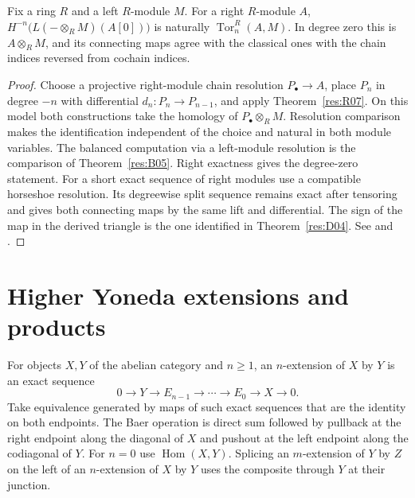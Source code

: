 \begin{proposition}
\label{res:R14}
Fix a ring \(R\) and a left \(R\)-module \(M\). For a right
\(R\)-module \(A\), \(H^{-n}\bigl(L(-\otimes_R M)(A[0])\bigr)\)
is naturally \(\operatorname{Tor}_n^R(A,M)\). In degree zero this is
\(A\otimes_R M\), and its connecting maps agree with the classical
ones with the chain indices reversed from cochain indices.
\end{proposition}
\begin{proof}
Choose a projective right-module chain resolution \(P_\bullet\to A\),
place \(P_n\) in degree \(-n\) with differential \(d_n:P_n\to P_{n-1}\),
and apply Theorem~\ref{res:R07}. On this model both constructions
take the homology of \(P_\bullet\otimes_R M\). Resolution comparison
makes the identification independent of the choice and natural in both
module variables. The balanced computation via a left-module resolution
is the comparison of Theorem~\ref{res:B05}. Right exactness gives
the degree-zero statement. For a short exact sequence of right modules
use a compatible horseshoe resolution. Its degreewise split sequence
remains exact after tensoring and gives both connecting maps by the
same lift and differential. The sign of the map in the derived
triangle is the one identified in Theorem~\ref{res:D04}. See
\cite[Section 3.2]{weibel} and \cite[Chapter 11]{p103}.
\end{proof}

\section{Higher Yoneda extensions and products}

For objects \(X,Y\) of the abelian category and \(n\ge1\), an
\(n\)-extension of \(X\) by \(Y\) is an exact sequence
\[
  0\longrightarrow Y\longrightarrow E_{n-1}\longrightarrow
  \cdots\longrightarrow E_0\longrightarrow X\longrightarrow 0 .
\]
Take equivalence generated by maps of such exact sequences that
are the identity on both endpoints. The Baer operation is direct
sum followed by pullback at the right endpoint along the diagonal
of \(X\) and pushout at the left endpoint along the codiagonal of
\(Y\). For \(n=0\) use \(\operatorname{Hom}(X,Y)\). Splicing an
\(m\)-extension of \(Y\) by \(Z\) on the left of an \(n\)-extension
of \(X\) by \(Y\) uses the composite through \(Y\) at their junction.


